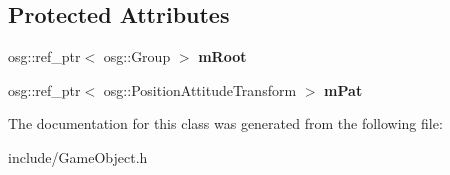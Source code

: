\subsection*{Protected Attributes}
\begin{DoxyCompactItemize}
\item 
\hypertarget{class_game_object_a0c115f237480a177850fa32947550efd}{
osg::ref\_\-ptr$<$ osg::Group $>$ {\bfseries mRoot}}
\label{class_game_object_a0c115f237480a177850fa32947550efd}

\item 
\hypertarget{class_game_object_a3608a32780ee338cf7dc856f827ff96e}{
osg::ref\_\-ptr$<$ osg::PositionAttitudeTransform $>$ {\bfseries mPat}}
\label{class_game_object_a3608a32780ee338cf7dc856f827ff96e}

\end{DoxyCompactItemize}


The documentation for this class was generated from the following file:\begin{DoxyCompactItemize}
\item 
include/GameObject.h\end{DoxyCompactItemize}
